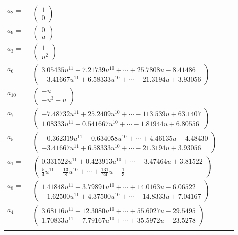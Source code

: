 \documentclass[1p]{elsarticle_modified}
\theoremstyle{definition}
\begin{document}
\begin{tabular}{m{7pt} m{180pt} m{7pt} m{180pt} }
\flushright $a_{2}=$&$\begin{pmatrix}1\\0\end{pmatrix}$ \\
\flushright $a_{9}=$&$\begin{pmatrix}0\\u\end{pmatrix}$ \\
\flushright $a_{3}=$&$\begin{pmatrix}1\\u^2\end{pmatrix}$ \\
\flushright $a_{6}=$&$\begin{pmatrix}3.05435 u^{11}-7.21739 u^{10}+\cdots+25.7808 u-8.41486\\-3.41667 u^{11}+6.58333 u^{10}+\cdots-21.3194 u+3.93056\end{pmatrix}$ \\
\flushright $a_{10}=$&$\begin{pmatrix}- u\\- u^3+u\end{pmatrix}$ \\
\flushright $a_{7}=$&$\begin{pmatrix}-7.48732 u^{11}+25.2409 u^{10}+\cdots-113.539 u+63.1407\\1.08333 u^{11}-0.541667 u^{10}+\cdots-1.81944 u+6.80556\end{pmatrix}$ \\
\flushright $a_{5}=$&$\begin{pmatrix}-0.362319 u^{11}-0.634058 u^{10}+\cdots+4.46135 u-4.48430\\-3.41667 u^{11}+6.58333 u^{10}+\cdots-21.3194 u+3.93056\end{pmatrix}$ \\
\flushright $a_{1}=$&$\begin{pmatrix}0.331522 u^{11}+0.423913 u^{10}+\cdots-3.47464 u+3.81522\\\frac{5}{4} u^{11}-\frac{13}{8} u^{10}+\cdots+\frac{131}{24} u-\frac{1}{3}\end{pmatrix}$ \\
\flushright $a_{8}=$&$\begin{pmatrix}1.41848 u^{11}-3.79891 u^{10}+\cdots+14.0163 u-6.06522\\-1.62500 u^{11}+4.37500 u^{10}+\cdots-14.8333 u+7.04167\end{pmatrix}$ \\
\flushright $a_{4}=$&$\begin{pmatrix}3.68116 u^{11}-12.3080 u^{10}+\cdots+55.6027 u-29.5495\\1.70833 u^{11}-7.79167 u^{10}+\cdots+35.5972 u-23.5278\end{pmatrix}$\\&\end{tabular}
\end{document}
